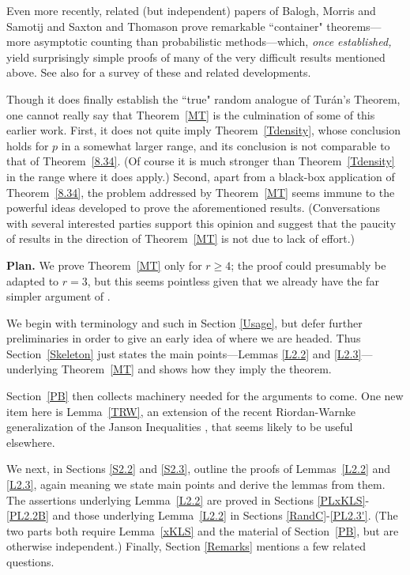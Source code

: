 \documentclass[letterpaper,11pt]{article}
\newcommand{\mn}[0]{\medskip\noindent}
\newcommand{\0}[0]{\emptyset}
\begin{document}
Even more recently, related (but independent) papers of
Balogh, Morris and Samotij \cite{BMS}
and Saxton and Thomason \cite{ST} prove remarkable ``container" theorems---more
asymptotic counting than
probabilistic methods---which, {\em once established,}
yield surprisingly simple proofs of many of the
very difficult results mentioned above.
%
See also \cite{Rodl-Schacht} for a survey of these
and related developments.

Though it does finally establish
the ``true" random analogue
of Tur\'an's Theorem,
one cannot really say
that Theorem~\ref{MT}
is the culmination of some of this earlier work.
First,
it does not quite imply Theorem~\ref{Tdensity},
whose conclusion holds for $p$ in a somewhat larger range, and
its conclusion is not comparable to that of Theorem~\ref{8.34}.
(Of course it %
is much stronger than Theorem~\ref{Tdensity} in the range where
it does apply.)
%
Second,
apart
from a black-box application of Theorem~\ref{8.34},
the problem addressed by Theorem~\ref{MT}
seems immune to the powerful ideas developed to prove
the aforementioned results.
(Conversations with several interested parties support
this opinion and
suggest
that the paucity of
results in the direction of Theorem~\ref{MT}
is not due to lack of effort.)

\mn
{\bf Plan.}
%
We prove Theorem~\ref{MT} only for $r\geq 4$;
the proof could presumably be adapted to $r=3$, but
this seems pointless given that we already have
the far simpler argument of \cite{DKMantel}.



We begin with terminology and such in Section \ref{Usage},
but defer further preliminaries
in order to give an early idea
of where we are headed.
Thus Section~\ref{Skeleton}
just states the main points---Lemmas \ref{L2.2} and
\ref{L2.3}---underlying
Theorem~\ref{MT}
and
shows how they imply the theorem.

Section~\ref{PB} then
collects machinery needed for the arguments to come.
One new item here
is Lemma~\ref{TRW}, an extension of the recent
Riordan-Warnke generalization
\cite{RW} of the Janson Inequalities
\cite{Janson}, that seems likely to be useful elsewhere.

We next, in Sections \ref{S2.2} and \ref{S2.3},
outline the proofs of
Lemmas~\ref{L2.2} and \ref{L2.3},
again meaning we state main points and derive the lemmas
from them.  The assertions underlying
Lemma~\ref{L2.2} are proved in
Sections \ref{PLxKLS}-\ref{PL2.2B}
and those
underlying
Lemma~\ref{L2.2} in
Sections \ref{RandC}-\ref{PL2.3'}.
(The two parts both require Lemma~\ref{xKLS} and
the material of Section~\ref{PB}, but are otherwise independent.)
Finally, Section \ref{Remarks} mentions a few
related questions.
\end{document}
